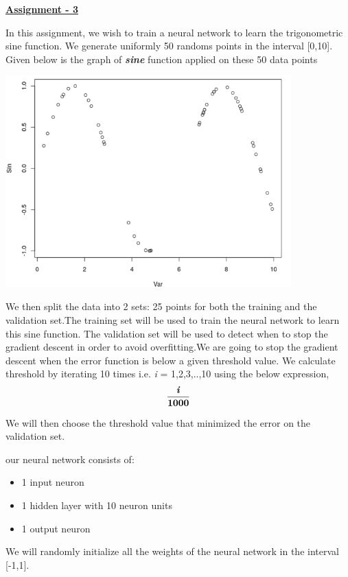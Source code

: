 \documentclass[a4paper,10pt]{article}
\begin{document}
\newpage
\textbf{\underline{Assignment - 3}} \par
In this assignment, we wish to train a neural network to learn the trigonometric sine function. 
We generate uniformly 50 randoms points in the interval [0,10]. Given below is the graph of \textbf{\textit{sine}} function applied on these 50 data points \par
\begin{center}
    \includegraphics[width=110mm,scale=0.10]{Picture_1.png}
\end{center}
We then split the data into 2 sets: 25 points for both the training and the validation set.The training set will be used to train the neural network to learn this sine function.
The validation set will be used to detect when to stop the gradient descent in order to avoid overfitting.We are going to stop the gradient descent when the error function is below a given threshold value.
We calculate threshold by iterating 10 times i.e. \textit{i} = 1,2,3,..,10 using the below expression,
\begin{equation*}
    \frac{\textbf{\textit{i}}}{\textbf{1000}}
\end{equation*} \par
We will then choose the threshold value that minimized the error on the validation set.\par
our neural network consists of:
\begin{itemize}
    \item 1 input neuron
    \item 1 hidden layer with 10 neuron units
    \item 1 output neuron
\end{itemize} \par
We will randomly initialize all the weights of the neural network in the interval [-1,1]. 
\end{document}

